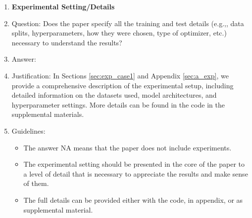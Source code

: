 \documentclass{article}
\theoremstyle{plain}
\theoremstyle{definition}
\theoremstyle{remark}
\begin{document}
\begin{enumerate}
\item {\bf Experimental Setting/Details}
    \item[] Question: Does the paper specify all the training and test details (e.g.,, data splits, hyperparameters, how they were chosen, type of optimizer, etc.) necessary to understand the results?
    \item[] Answer: \answerYes{} %
    \item[] Justification: In Sections \ref{sec:exp_case1} and Appendix \ref{sec:a_exp}, we provide a comprehensive description of the experimental setup, including detailed information on the datasets used, model architectures, and hyperparameter settings. More details can be found in the code in the supplemental materials.
    \item[] Guidelines:
    \begin{itemize}
        \item The answer NA means that the paper does not include experiments.
        \item The experimental setting should be presented in the core of the paper to a level of detail that is necessary to appreciate the results and make sense of them.
        \item The full details can be provided either with the code, in appendix, or as supplemental material.
    \end{itemize}


\end{enumerate}
\end{document}

